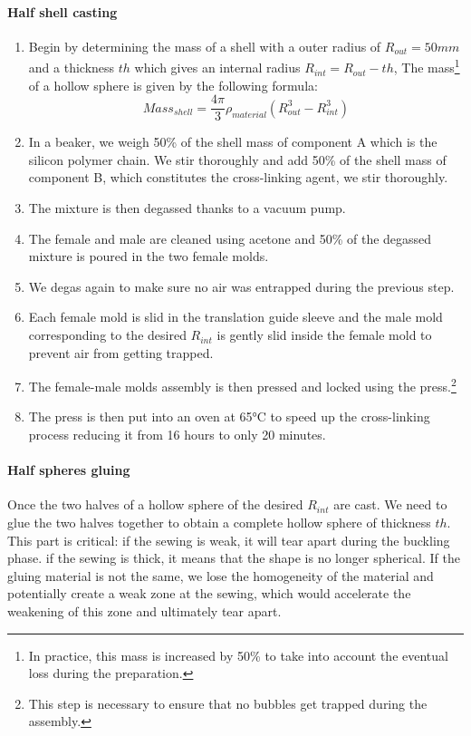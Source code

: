 \paragraph{Half shell casting}
\begin{enumerate}
	\item Begin by determining the mass of a shell with a outer radius of $R_{out}= 50 mm$ and a thickness $th$ which gives an internal radius $R_{int} = R_{out}-th$, The mass\footnote{In practice, this mass is increased by 50\% to take into account the eventual loss during the preparation.} of a hollow sphere is given by the following formula:
		\[Mass_{shell} = \frac{4\pi}{3}\rho_{material} (R_{out}^3-R_{int}^3) \]

	\item In a beaker, we weigh 50\% of the shell mass of component A which is the silicon polymer chain. We stir thoroughly and add 50\% of the shell mass of component B, which constitutes the cross-linking agent, we stir thoroughly.
	\item The mixture is then degassed thanks to a vacuum pump.
	\item The female and male are cleaned using acetone and 50\% of the degassed mixture is poured in the two female molds.
	\item We degas again to make sure no air was entrapped during the previous step.
	\item Each female mold is slid in the translation guide sleeve and the male mold corresponding to the desired $R_{int}$ is gently slid inside the female mold to prevent air from getting trapped.
	\item The female-male molds assembly is then pressed and locked using the press.\footnote{This step is necessary to ensure that no bubbles get trapped during the assembly.}
	\item The press is then put into an oven at 65°C to speed up the cross-linking process reducing it from 16 hours to only 20 minutes.
	
\end{enumerate}

\paragraph{Half spheres gluing}
Once the two halves of a hollow sphere of the desired $R_{int}$ are cast. We need to glue the two halves together to obtain a complete hollow sphere of thickness $th$.
This part is critical: if the sewing is weak, it will tear apart during the buckling phase. if the sewing is thick, it means that the shape is no longer spherical. If the gluing material is not the same, we lose the homogeneity of the material and potentially create a weak zone at the sewing, which would accelerate the weakening of this zone and ultimately tear apart.
